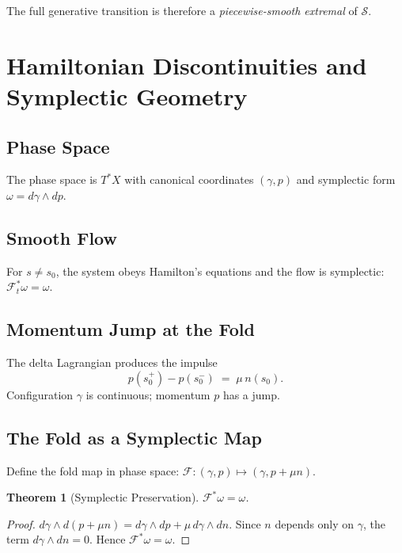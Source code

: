 \documentclass[12pt, oneside]{book}
\theoremstyle{plain}
\newtheorem{theorem}{Theorem}[section]
\theoremstyle{definition}
\theoremstyle{remark}
\begin{document}
The full generative transition is therefore a
\emph{piecewise-smooth extremal} of $\mathcal{S}$.

\section{Hamiltonian Discontinuities and Symplectic Geometry}

\subsection{Phase Space}

The phase space is $T^*X$ with canonical coordinates $(\gamma, p)$
and symplectic form $\omega = d\gamma \wedge dp$.

\subsection{Smooth Flow}

For $s \ne s_0$, the system obeys Hamilton's equations and the flow
is symplectic: $\mathcal{F}_t^*\omega = \omega$.

\subsection{Momentum Jump at the Fold}

The delta Lagrangian produces the impulse
\[
p(s_0^+) - p(s_0^-) \;=\; \mu\,n(s_0).
\]
Configuration $\gamma$ is continuous; momentum $p$ has a jump.

\subsection{The Fold as a Symplectic Map}

Define the fold map in phase space:
$\mathcal{F} : (\gamma, p) \mapsto (\gamma, p + \mu n)$.

\begin{theorem}[Symplectic Preservation]
$\mathcal{F}^*\omega = \omega$.
\end{theorem}

\begin{proof}
$d\gamma \wedge d(p + \mu n) = d\gamma \wedge dp
  + \mu\,d\gamma \wedge dn$.
Since $n$ depends only on $\gamma$, the term
$d\gamma \wedge dn = 0$.
Hence $\mathcal{F}^*\omega = \omega$.
\end{proof}
\end{document}
